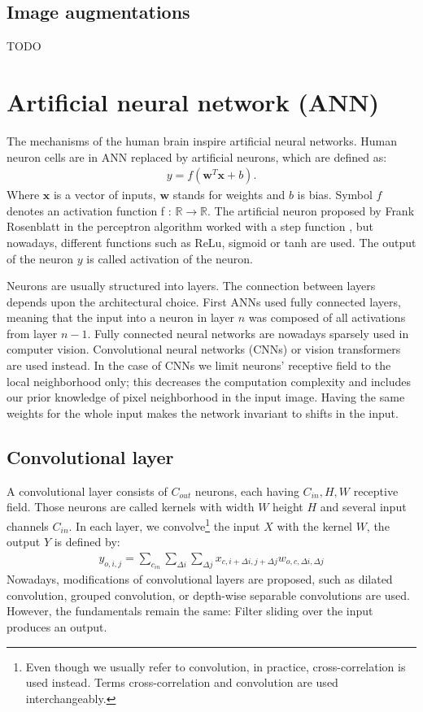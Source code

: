 \subsection{Image augmentations}
TODO


\section{Artificial neural network (ANN)}
The mechanisms of the human brain inspire artificial neural networks. Human neuron cells are in ANN replaced by artificial neurons, which are defined as:
\begin{align}
    y = f \left( \boldsymbol{w}^T \boldsymbol{x}  + b \right).
\end{align}
Where $\boldsymbol{x}$ is a vector of inputs, $\boldsymbol{w}$ stands for weights and $b$ is bias. Symbol $f$ denotes an activation function f : $\mathbb{R} \rightarrow \mathbb{R}$. The artificial neuron proposed by Frank Rosenblatt in the perceptron algorithm worked with a step function \cite{Rosenblatt1958}, but nowadays, different functions such as ReLu, sigmoid or tanh are used. The output of the neuron $y$ is called activation of the neuron.

Neurons are usually structured into layers. The connection between layers depends upon the architectural choice. First ANNs used fully connected layers, meaning that the input into a neuron in layer $n$ was composed of all activations from layer $n-1$. Fully connected neural networks are nowadays sparsely used in computer vision. Convolutional neural networks (CNNs) or vision transformers are used instead. In the case of CNNs we limit neurons' receptive field to the local neighborhood only; this decreases the computation complexity and includes our prior knowledge of pixel neighborhood in the input image. Having the same weights for the whole input makes the network invariant to shifts in the input.

\subsection{Convolutional layer}
A convolutional layer consists of $C_{out}$ neurons, each having $C_{in}, H, W$ receptive field. Those neurons are called kernels with width $W$ height $H$ and several input channels $C_{in}$. In each layer, we convolve\footnote{Even though we usually refer to convolution, in practice, cross-correlation is used instead. Terms cross-correlation and convolution are used interchangeably.} the input $X$  with the kernel $W$, the output $Y$ is defined by:
\begin{align}
    y_{o,i,j} = \sum_{c_{in}} \sum_{\Delta i} \sum_{\Delta j} x_{c, i+\Delta i, j + \Delta j}  w_{o,c, \Delta i, \Delta j}
\end{align}
Nowadays, modifications of convolutional layers are proposed, such as dilated convolution, grouped convolution, or depth-wise separable convolutions are used. However, the fundamentals remain the same: Filter sliding over the input produces an output.

